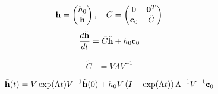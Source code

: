 \documentclass{article}[draft]
\begin{document}
%



\newpage

\begin{align*}
\mathbf{h} =
\begin{pmatrix}
h_0 \\
\tilde{\mathbf{h}}
\end{pmatrix}
,\quad
C = 
\begin{pmatrix}
0 & \mathbf{0}^T \\
\mathbf{c}_0 & \tilde{C}
\end{pmatrix}
\end{align*}
\begin{align*}
\frac{d \tilde{\mathbf{h}}}{dt} = \tilde{C} \tilde{\mathbf{h}} + h_0 \mathbf{c}_0
\end{align*}

\begin{align*}
\tilde{C} &= V \Lambda V^{-1}
\end{align*}

\begin{align*}
\tilde{\vect{h}}\of{t} = V \exp\of{\Lambda t} V^{-1} \tilde{\vect{h}}\of{0} + h_0 V \left( I - \exp\of{\Lambda t} \right) \Lambda^{-1} V^{-1} \vect{c}_0
\end{align*}
\end{document}
